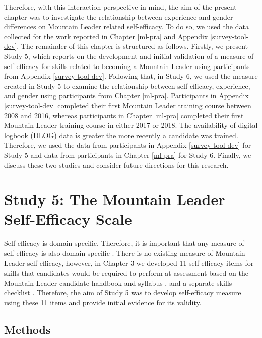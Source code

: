 \documentclass[
  12pt,
  a4paper,
]{book}
\begin{document}
Therefore, with this interaction perspective in mind, the aim of the present chapter was to investigate the relationship between experience and gender differences on Mountain Leader related self-efficacy. To do so, we used the data collected for the work reported in Chapter \ref{ml-pra} and Appendix \ref{survey-tool-dev}. The remainder of this chapter is structured as follows. Firstly, we present Study 5, which reports on the development and initial validation of a measure of self-efficacy for skills related to becoming a Mountain Leader using participants from Appendix \ref{survey-tool-dev}. Following that, in Study 6, we used the measure created in Study 5 to examine the relationship between self-efficacy, experience, and gender using participants from Chapter \ref{ml-pra}. Participants in Appendix \ref{survey-tool-dev} completed their first Mountain Leader training course between 2008 and 2016, whereas participants in Chapter \ref{ml-pra} completed their first Mountain Leader training course in either 2017 or 2018. The availability of digital logbook (DLOG) data is greater the more recently a candidate was trained. Therefore, we used the data from participants in Appendix \ref{survey-tool-dev} for Study 5 and data from participants in Chapter \ref{ml-pra} for Study 6. Finally, we discuss these two studies and consider future directions for this research.

\hypertarget{study-5}{%
\section{Study 5: The Mountain Leader Self-Efficacy Scale}\label{study-5}}

Self-efficacy is domain specific. Therefore, it is important that any measure of self-efficacy is also domain specific \citep{Bandura2006}. There is no existing measure of Mountain Leader self-efficacy, however, in Chapter 3 we developed 11 self-efficacy items for skills that candidates would be required to perform at assessment based on the Mountain Leader candidate handbook and syllabus \citep{MTUK2015a}, and a separate skills checklist \citep{MTUK2015}. Therefore, the aim of Study 5 was to develop self-efficacy measure using these 11 items and provide initial evidence for its validity.

\hypertarget{study-5-methods}{%
\subsection{Methods}\label{study-5-methods}}
\end{document}
